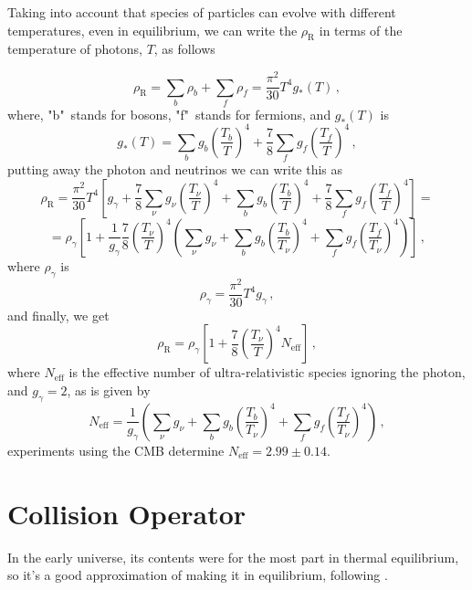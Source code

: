 Taking into account that species of particles can evolve with different temperatures, even in equilibrium, we can write the $\rho_{\textrm{R}}$ in terms of the temperature of photons, $T$, as follows

\begin{equation}
\label{3.32}
	\rho_{\textrm{R}}=\sum\limits_{b}\rho_{b}+\sum\limits_{f}\rho_{f}=\frac{\pi^2}{30}T^4g_*(T)\,,
\end{equation}
where, "b"\ stands for bosons, "f"\ stands for fermions, and $g_*(T)$ is
\begin{equation}
	g_*(T)=\sum\limits_{b}g_b\left(\frac{T_b}{T}\right)^4+\dfrac{7}{8}\sum\limits_{f}g_f\left(\frac{T_f}{T}\right)^4\,,
\end{equation}
putting away the photon and neutrinos we can write this as
\begin{equation}
	\nonumber
	\rho_{\textrm{R}}=\frac{\pi^2}{30}T^4\left[g_\gamma+\frac{7}{8}\sum\limits_{\nu}g_\nu\left(\frac{T_\nu}{T}\right)^4+\sum\limits_{b}g_b\left(\frac{T_b}{T}\right)^4+\frac{7}{8}\sum\limits_{f}g_f\left(\frac{T_f}{T}\right)^4\right]=
\end{equation}
\begin{equation}
	\nonumber
	=\rho_\gamma\left[1+\frac{1}{g_\gamma}\frac{7}{8}\left(\frac{T_\nu}{T}\right)^4\left(\sum\limits_{\nu}g_\nu+\sum\limits_{b}g_b\left(\frac{T_b}{T_\nu}\right)^4+\sum\limits_{f}g_f\left(\frac{T_f}{T_\nu}\right)^4\right)\right]\,,
\end{equation}
where $\rho_\gamma$ is
\begin{equation}
	\rho_\gamma=\frac{\pi^2}{30}T^4g_\gamma\,,
\end{equation}
and finally, we get
\begin{equation}
	\rho_{\textrm{R}}=\rho_\gamma\left[1+\frac{7}{8}\left(\frac{T_\nu}{T}\right)^4N_\textrm{eff}\right]\,,
\end{equation}
where $N_\textrm{eff}$ is the effective number of ultra-relativistic species ignoring the photon, and $g_\gamma=2$, as is given by
\begin{equation}
	N_\textrm{eff}=\frac{1}{g_\gamma}\left(\sum\limits_{\nu}g_\nu+\sum\limits_{b}g_b\left(\frac{T_b}{T_\nu}\right)^4+\sum\limits_{f}g_f\left(\frac{T_f}{T_\nu}\right)^4\right)\,,
\end{equation}
experiments using the CMB determine $N_\textrm{eff}=2.99 \pm 0.14$\cite{2020}.


\section{Collision Operator}
In the early universe, its contents were for the most part in thermal equilibrium, so it's a good approximation of making it in equilibrium, following \cite{kolb}.

